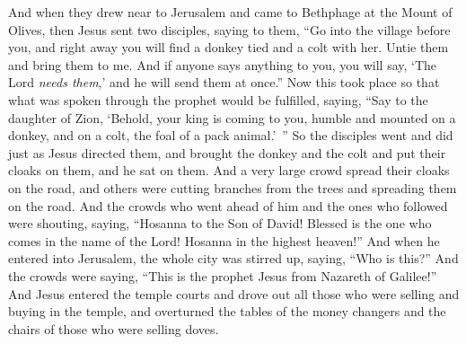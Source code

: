 \begin{biblechapter} %
 And when they drew near to Jerusalem and came to Bethphage at the Mount of Olives, then Jesus sent two disciples,
\verse saying to them, “Go into the village before you, and right away you will find a donkey tied and a colt with her. Untie them and bring them to me.
\verse And if anyone says anything to you, you will say, ‘The Lord \textit{needs them},’ and he will send them at once.”
\verse Now this took place so that what was spoken through the prophet would be fulfilled, saying,
\verse “Say to the daughter of Zion, 
‘Behold, your king is coming to you, 
humble and mounted on a donkey, 
and on a colt, the foal of a pack animal.’ ”
\verse So the disciples went and did just as Jesus directed them,
\verse and brought the donkey and the colt and put their cloaks on them, and he sat on them.
\verse And a very large crowd spread their cloaks on the road, and others were cutting branches from the trees and spreading them on the road.
\verse And the crowds who went ahead of him and the ones who followed were shouting, saying, “Hosanna to the Son of David! 
Blessed is the one who comes in the name of the Lord! 
Hosanna in the highest heaven!”
\verse And when he entered into Jerusalem, the whole city was stirred up, saying, “Who is this?”
\verse And the crowds were saying, “This is the prophet Jesus from Nazareth of Galilee!”
 And Jesus entered the temple courts and drove out all those who were selling and buying in the temple, and overturned the tables of the money changers and the chairs of those who were selling doves.

\end{biblechapter}
